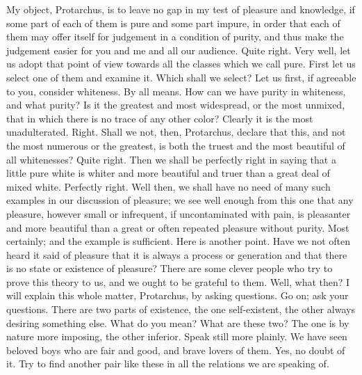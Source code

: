 \documentclass[letterpaper,12pt]{article}
\newcommand{\stephpag}[1]{\marginnote{\small\itshape\fontfamily{ppl}\selectfont #1}}
\begin{document}
\begin{drama}
\socratesspeaks
My object, Protarchus, is to leave no gap in my test of pleasure \stephpag{e} and knowledge, if some part of each of them is pure and some part impure, in order that each of them may offer itself for judgement in a condition of purity, and thus make the judgement easier for you and me and all our audience.
\protarchusspeaks
Quite right.
\socratesspeaks
Very well, let us adopt that point of view towards all the classes which we call pure. First let us select one of them and examine it. \stephpag{53 a}
\protarchusspeaks
Which shall we select?
\socratesspeaks
Let us first, if agreeable to you, consider whiteness.
\protarchusspeaks
By all means.
\socratesspeaks
How can we have purity in whiteness, and what purity? Is it the greatest and most widespread, or the most unmixed, that in which there is no trace of any other color?
\protarchusspeaks
Clearly it is the most unadulterated.
\socratesspeaks
Right. Shall we not, then, Protarchus, declare that this, and not the most numerous or the greatest, \stephpag{b} is both the truest and the most beautiful of all whitenesses?
\protarchusspeaks
Quite right.
\socratesspeaks
Then we shall be perfectly right in saying that a little pure white is whiter and more beautiful and truer than a great deal of mixed white.
\protarchusspeaks
Perfectly right.
\socratesspeaks
Well then, we shall have no need of many such examples in our discussion of pleasure; we see well enough from this one that any pleasure, \stephpag{c} however small or infrequent, if uncontaminated with pain, is pleasanter and more beautiful than a great or often repeated pleasure without purity.
\protarchusspeaks
Most certainly; and the example is sufficient.
\socratesspeaks
Here is another point. Have we not often heard it said of pleasure that it is always a process or generation and that there is no state or existence of pleasure? There are some clever people who try to prove this theory to us, and we ought to be grateful to them.
\protarchusspeaks
Well, what then?
\socratesspeaks
I will explain this whole matter, Protarchus, \stephpag{d} by asking questions.
\protarchusspeaks
Go on; ask your questions.
\socratesspeaks
There are two parts of existence, the one self-existent, the other always desiring something else.
\protarchusspeaks
What do you mean? What are these two?
\socratesspeaks
The one is by nature more imposing, the other inferior.
\protarchusspeaks
Speak still more plainly.
\socratesspeaks
We have seen beloved boys who are fair and good, and brave lovers of them.
\protarchusspeaks
Yes, no doubt of it.
\socratesspeaks
Try to find another pair like these \stephpag{e} in all the relations we are speaking of.

\end{drama}
\end{document}
